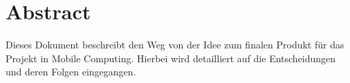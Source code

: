 \chapter{Abstract}
Dieses Dokument beschreibt den Weg von der Idee zum finalen Produkt für das Projekt in Mobile Computing. Hierbei wird detailliert auf die Entscheidungen und deren Folgen eingegangen.
